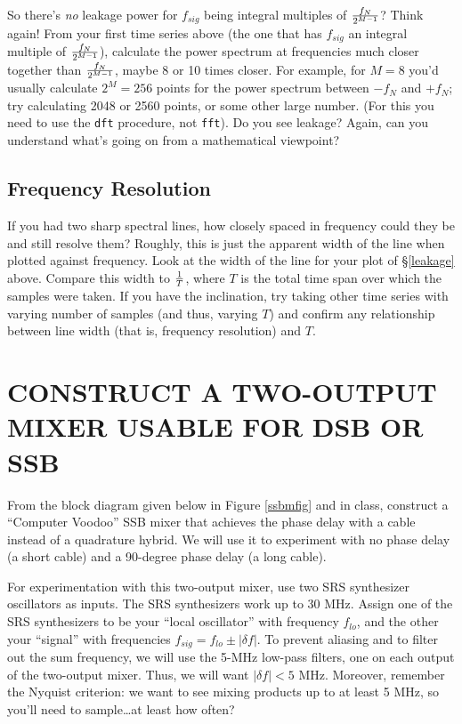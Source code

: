 \documentclass[11pt,preprint]{aastex}
\begin{document}
So there's {\it no} leakage power for $f_{sig}$ being integral multiples of
$f_N \over 2^{M-1}$? Think again! From your first time series above (the
one that has $f_{sig}$ an integral multiple of $f_N \over 2^{M-1}$),
calculate the power spectrum at frequencies much closer together than $f_N
\over 2^{M-1}$, maybe 8 or 10 times closer. For example, for $M=8$ you'd
usually calculate $2^M=256$ points for the power spectrum between $-f_N$
and $+f_N$; try calculating 2048 or 2560 points, or some other large
number. (For this you need to use the {\tt dft} procedure, not {\tt fft}).
Do you see leakage? Again, can you understand what's going on from a
mathematical viewpoint?

\subsection{Frequency Resolution}

If you had two sharp spectral lines, how closely spaced in frequency
could they be and still resolve them? Roughly, this is just the apparent
width of the line when plotted against frequency. Look at the width of
the line for your plot of \S \ref{leakage} above. Compare this width to
$1 \over T$, where $T$ is the total time span over which the samples
were taken. If you have the inclination, try taking other time series
with varying number of samples (and thus, varying $T$) and confirm any
relationship between line width (that is, frequency resolution) and
$T$. 




\section{ CONSTRUCT A TWO-OUTPUT MIXER USABLE FOR DSB OR SSB}
\label{upperlowerdsb}

From the block diagram given below in Figure \ref{ssbmfig} and in class,
construct a ``Computer Voodoo'' SSB mixer that achieves the phase delay
with a cable instead of a quadrature hybrid. We will use it to experiment
with no phase delay (a short cable) and a 90-degree phase delay (a long
cable).

For experimentation with this two-output mixer, use two SRS synthesizer
oscillators as inputs.  The SRS synthesizers work up to 30 MHz.  Assign
one of the SRS synthesizers to be your ``local oscillator'' with
frequency $f_{lo}$, and the other your ``signal'' with frequencies $f_{sig}
= f_{lo} \pm |\delta f|$.  To prevent aliasing and to filter out the sum
frequency, we will use the 5-MHz low-pass filters, one on each output of
the two-output mixer. Thus, we will want $|\delta f| < 5$ MHz. Moreover,
remember the Nyquist criterion: we want to see mixing products up to at
least 5 MHz, so you'll need to sample\dots at least how often?
\end{document}
